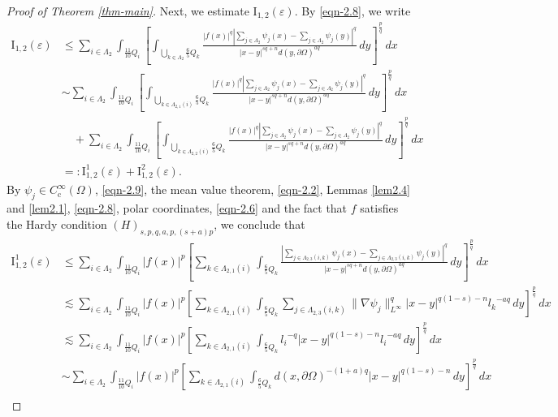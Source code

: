 \documentclass[11pt,twoside]{article}
\def\Qi{\frac{11}{10}Q_i}
\def\Qkk{\frac{6}{5}Q_k}
\def\fz{\infty }
\def\boz{{\Omega}}
\def\vez{\varepsilon}
\def\pa{\partial}                %
\theoremstyle{mylem}
\theoremstyle{definition}
\numberwithin{equation}{section}
\begin{document}
\begin{proof}[Proof of Theorem \ref{thm-main}]
Next, we estimate \( \mathrm{I}_{1,2}(\vez) \). By \eqref{eqn-2.8}, we write
\begin{align}\label{eqn-4.9}
\mathrm{I}_{1,2}(\vez)
&\leq \sum_{i \in \Lambda_2} \int_{\Qi} \left[ \int_{\bigcup_{k \in \Lambda_2} \Qkk} \frac{| f(x)|^q |\sum_{j \in \Lambda_2} \psi_j(x) - \sum_{j \in \Lambda_2} \psi_j(y)|^q}{|x - y|^{s q + n}d(y,\pa\boz)^{aq}}\,dy \right]^{\frac{p}{q}}\,dx \nonumber \\
&\sim \sum_{i \in \Lambda_2} \int_{\Qi} \left[ \int_{\bigcup_{k \in \Lambda_{2,1}(i)} \Qkk} \frac{| f(x)|^q |\sum_{j \in \Lambda_2} \psi_j(x) - \sum_{j \in \Lambda_2} \psi_j(y)|^q}{|x - y|^{s q + n}d(y,\pa\boz)^{aq}}\,dy \right]^{\frac{p}{q}}\,dx \nonumber \\
&\quad+ \sum_{i \in \Lambda_2} \int_{\Qi} \left[ \int_{\bigcup_{k \in \Lambda_{2,2}(i)} \Qkk} \frac{| f(x)|^q |\sum_{j \in \Lambda_2} \psi_j(x) - \sum_{j \in \Lambda_2} \psi_j(y)|^q}{|x - y|^{s q + n}d(y,\pa\boz)^{aq}}\,dy \right]^{\frac{p}{q}}\,dx \nonumber \\
&=: \mathrm{I}_{1,2}^1(\vez) + \mathrm{I}_{1,2}^2(\vez).
\end{align}
By $\psi_j \in C_{\mathrm{c}}^{\fz}(\boz)$, \eqref{eqn-2.9}, the mean value theorem, \eqref{eqn-2.2}, Lemmas \ref{lem2.4} and \ref{lem2.1}, \eqref{eqn-2.8}, polar coordinates, \eqref{eqn-2.6} and the fact that $f$ satisfies the Hardy condition $(H)_{s,p,q,a,p,(s+a)p}$, we conclude that
\begin{align}\label{eqn-4.10}
\mathrm{I}_{1,2}^1(\vez)
&\leq \sum_{i \in \Lambda_2} \int_{\Qi} | f(x)|^p \left[ \sum_{k \in \Lambda_{2,1}(i)} \int_{\Qkk} \frac{|\sum_{j \in \Lambda_{2,3}(i,k)} \psi_j(x) -\sum_{j \in \Lambda_{2,3}(i,k)} \psi_j(y)|^q}{|x - y|^{s q + n}d(y,\pa\boz)^{aq}}\,dy \right]^{\frac{p}{q}}\,dx  \nonumber \\
&\lesssim \sum_{i \in \Lambda_2} \int_{\Qi} | f(x)|^p \left[ \sum_{k \in \Lambda_{2,1}(i)} \int_{\Qkk} \sum_{j \in \Lambda_{2,3}(i,k)}{\| \nabla \psi_j \|_{L^\infty}^q |x - y|^{q(1 - s)-n}{l_k}^{-aq}}\,dy \right]^{\frac{p}{q}}\,dx \nonumber \\
&\lesssim \sum_{i \in \Lambda_2} \int_{\Qi} | f(x)|^p \left[ \sum_{k \in \Lambda_{2,1}(i)} \int_{\Qkk} {{l_i}^{-q} |x - y|^{q(1 - s)-n}{l_i}^{-aq}}\,dy \right]^{\frac{p}{q}}\,dx  \nonumber \\
&\sim \sum_{i \in \Lambda_2} \int_{\Qi} | f(x)|^p \left[ \sum_{k \in \Lambda_{2,1}(i)} \int_{\Qkk} {{d(x,\pa\boz)}^{-(1+a)q} |x - y|^{q(1 - s)-n}}\,dy \right]^{\frac{p}{q}}\,dx  \nonumber \\

\end{align}
\end{proof}
\end{document}
